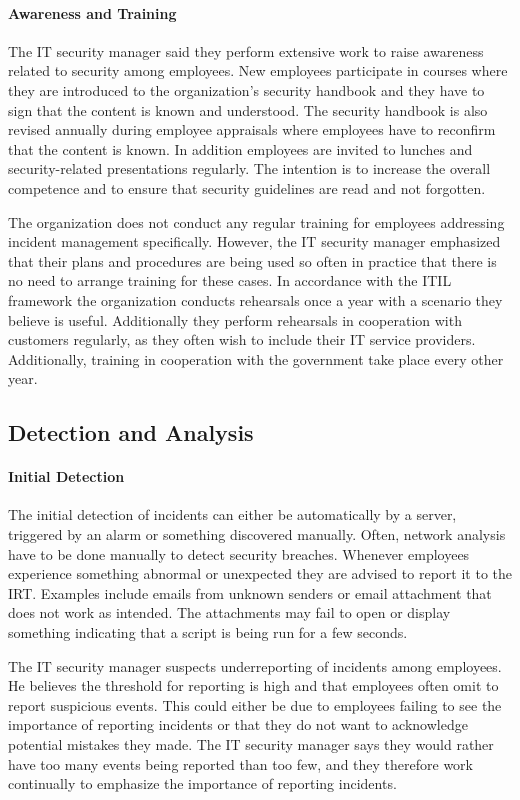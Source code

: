 \paragraph{Awareness and Training}
The IT security manager said they perform extensive work to raise awareness related to security among employees. New employees participate in courses where they are introduced to the organization's security handbook and they have to sign that the content is known and understood. The security handbook is also revised annually during employee appraisals where employees have to reconfirm that the content is known. In addition employees are invited to lunches and security-related presentations regularly. The intention is to increase the overall competence and to ensure that security guidelines are read and not forgotten.

The organization does not conduct any regular training for employees addressing incident management specifically. However, the IT security manager emphasized that their plans and procedures are being used so often in practice that there is no need to arrange training for these cases. In accordance with the ITIL framework the organization conducts rehearsals once a year with a scenario they believe is useful. Additionally they perform rehearsals in cooperation with customers regularly, as they often wish to include their IT service providers. Additionally, training in cooperation with the government take place every other year. 

\subsection{Detection and Analysis}
\paragraph{Initial Detection}
The initial detection of incidents can either be automatically by a server, triggered by an alarm or something discovered manually. Often, network analysis have to be done manually to detect security breaches. Whenever employees experience something abnormal or unexpected they are advised to report it to the \ac{IRT}. Examples include emails from unknown senders or email attachment that does not work as intended. The attachments may fail to open or display something indicating that a script is being run for a few seconds.

The IT security manager suspects underreporting of incidents among employees. He believes the threshold for reporting is high and that employees often omit to report suspicious events. This could either be due to employees failing to see the importance of reporting incidents or that they do not want to acknowledge potential mistakes they made. The IT security manager says they would rather have too many events being reported than too few, and they therefore work continually to emphasize the importance of reporting incidents.

